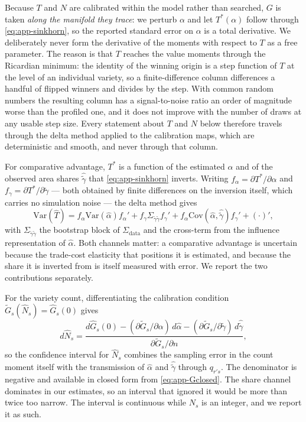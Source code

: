 Because $T$ and $N$ are calibrated within the model rather than searched, $G$ is taken
\emph{along the manifold they trace}: we perturb $\alpha$ and let $T^{*}(\alpha)$ follow through
\eqref{eq:app-sinkhorn}, so the reported standard error on $\alpha$ is a total derivative. We
deliberately never form the derivative of the moments with respect to $T$ as a free parameter.
The reason is that $T$ reaches the value moments through the Ricardian minimum: the identity of
the winning origin is a step function of $T$ at the level of an individual variety, so a
finite-difference column differences a handful of flipped winners and divides by the step. With
common random numbers the resulting column has a signal-to-noise ratio an order of magnitude
worse than the profiled one, and it does not improve with the number of draws at any usable step
size. Every statement about $T$ and $N$ below therefore travels through the delta method applied
to the calibration maps, which are deterministic and smooth, and never through that column.

For comparative advantage, $T^{*}$ is a function of the estimated $\hat\alpha$ and of the
observed area shares $\hat{\tilde\gamma}$ that \eqref{eq:app-sinkhorn} inverts. Writing
$f_{\alpha}=\partial T^{*}/\partial\alpha$ and $f_{\gamma}=\partial T^{*}/\partial\tilde\gamma$
--- both obtained by finite differences on the inversion itself, which carries no simulation
noise --- the delta method gives
\begin{equation}
\mathrm{Var}(\hat T)=f_{\alpha}\mathrm{Var}(\hat\alpha)f_{\alpha}'
+f_{\gamma}\Sigma_{\tilde\gamma\tilde\gamma}f_{\gamma}'
+f_{\alpha}\mathrm{Cov}(\hat\alpha,\hat{\tilde\gamma})f_{\gamma}'+(\cdot)' ,
\label{eq:app-deltaT}
\end{equation}
with $\Sigma_{\tilde\gamma\tilde\gamma}$ the bootstrap block of $\Sigma_{\mathrm{data}}$ and the
cross-term from the influence representation of $\hat\alpha$. Both channels matter: a
comparative advantage is uncertain because the trade-cost elasticity that positions it is
estimated, and because the share it is inverted from is itself measured with error. We report the
two contributions separately.

For the variety count, differentiating the calibration condition
$\tilde G_{s}(\widehat N_{s})=\hat G_{s}(0)$ gives
\begin{equation}
d\widehat N_{s}=\frac{d\hat G_{s}(0)
-(\partial\tilde G_{s}/\partial\alpha)\,d\hat\alpha
-(\partial\tilde G_{s}/\partial\tilde\gamma)\,d\hat{\tilde\gamma}}
{\partial\tilde G_{s}/\partial n},
\label{eq:app-deltaN}
\end{equation}
so the confidence interval for $\widehat N_{s}$ combines the sampling error in the count moment
itself with the transmission of $\hat\alpha$ and $\hat{\tilde\gamma}$ through $q_{r's}$. The
denominator is negative and available in closed form from \eqref{eq:app-Gclosed}. The share
channel dominates in our estimates, so an interval that ignored it would be more than twice too
narrow. The interval is continuous while $N_{s}$ is an integer, and we report it as such.

